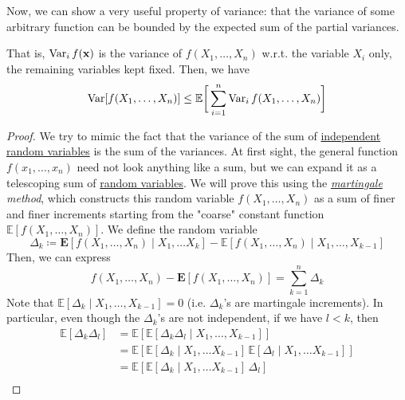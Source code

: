   Now, we can show a very useful property of variance: that the variance of some arbitrary function can be bounded by the expected sum of the partial variances. 

  \begin{theorem}
    \label{thm:tensorization-of-variance}
  That is, $\operatorname{Var}_i f(\mathbf{x})$ is the variance of $f(X_1, \ldots, X_n)$ w.r.t. the variable $X_i$ only, the remaining variables kept fixed. Then, we have 
  \begin{equation}
    \operatorname{Var}[f(X_1, \ldots, X_n)] \leq \mathbb{E} \bigg[ \sum_{i=1}^n \operatorname{Var}_i f(X_1, \ldots, X_n) \bigg]
  \end{equation}
  \end{theorem}
  \begin{proof}
  We try to mimic the fact that the variance of the sum of \hyperref[prob-def:independent-random-variables]{independent random variables} is the sum of the variances. At first sight, the general function $f(x_1, \ldots, x_n)$ need not look anything like a sum, but we can expand it as a telescoping sum of \hyperref[prob-def:random-variable]{random variables}. We will prove this using the \textit{\hyperref[sp-def:martingale]{martingale} method}, which constructs this random variable $f(X_1, \ldots, X_n)$ as a sum of finer and finer increments starting from the "coarse" constant function $\mathbb{E}[f(X_1, \ldots, X_n)]$. We define the random variable 
  \begin{equation}
    \Delta_k \coloneqq \mathbf{E}[ f(X_1, \ldots, X_n) \mid X_1, \ldots X_k] - \mathbb{E}[ f(X_1, \ldots, X_n) \mid X_1, \ldots, X_{k-1}]
  \end{equation}
  Then, we can express 
  \begin{equation}
    f( X_1, \ldots, X_n) - \mathbf{E}[ f(X_1, \ldots, X_n)] = \sum_{k=1}^n \Delta_k
  \end{equation}
  Note that $\mathbb{E}[\Delta_k \mid X_1, \ldots, X_{k-1}] = 0$ (i.e. $\Delta_k$'s are martingale increments). In particular, even though the $\Delta_k$'s are not independent, if we have $l < k$, then 
  \begin{align*}
      \mathbb{E}[ \Delta_k \Delta_l] & = \mathbb{E}[ \mathbb{E}[\Delta_k \Delta_l \mid X_1, \ldots, X_{k-1}]] \\
      & = \mathbb{E}[ \mathbb{E}[\Delta_k \mid X_1, \ldots X_{k-1} ] \, \mathbb{E}[\Delta_l \mid X_1, \ldots X_{k-1} ]] \\
      & = \mathbb{E}[ \mathbb{E}[\Delta_k \mid X_1, \ldots X_{k-1} ] \, \Delta_l] \\

\end{align*}
\end{proof}
